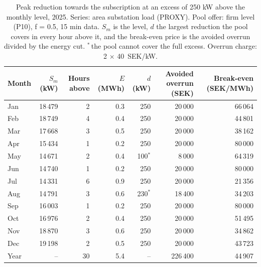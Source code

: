 \begin{table}[htbp]
\centering
\caption{Peak reduction towards the subscription at an excess of 250 kW above the monthly level, 2025. Series: area substation load (PROXY). Pool offer: firm level (P10), f = 0.5, 15 min data. $S_m$ is the level, $d$ the largest reduction the pool covers in every hour above it, and the break-even price is the avoided overrun divided by the energy cut. $^{*}$\,the pool cannot cover the full excess. Overrun charge: 2 $\times$ 40~SEK/kW.}
\label{tab:subscription_value}
\begin{tabular}{lrrrrrr}
\toprule
Month & $S_m$ (kW) & Hours above & $E$ (MWh) & $d$ (kW) & Avoided overrun (SEK) & Break-even (SEK/MWh) \\
\midrule
Jan & 18\,479 & 2 & 0.3 & 250 & 20\,000 & 66\,064 \\
Feb & 18\,749 & 4 & 0.4 & 250 & 20\,000 & 44\,801 \\
Mar & 17\,668 & 3 & 0.5 & 250 & 20\,000 & 38\,162 \\
Apr & 15\,434 & 1 & 0.2 & 250 & 20\,000 & 80\,000 \\
May & 14\,671 & 2 & 0.4 & 100$^{*}$ & 8\,000 & 64\,319 \\
Jun & 14\,740 & 1 & 0.2 & 250 & 20\,000 & 80\,000 \\
Jul & 14\,331 & 6 & 0.9 & 250 & 20\,000 & 21\,356 \\
Aug & 14\,791 & 3 & 0.6 & 230$^{*}$ & 18\,400 & 34\,203 \\
Sep & 16\,003 & 1 & 0.2 & 250 & 20\,000 & 80\,000 \\
Oct & 16\,976 & 2 & 0.4 & 250 & 20\,000 & 51\,495 \\
Nov & 18\,870 & 3 & 0.6 & 250 & 20\,000 & 34\,862 \\
Dec & 19\,198 & 2 & 0.5 & 250 & 20\,000 & 43\,723 \\
\midrule
Year & -- & 30 & 5.4 & -- & 226\,400 & 44\,907 \\
\bottomrule
\end{tabular}
\end{table}
